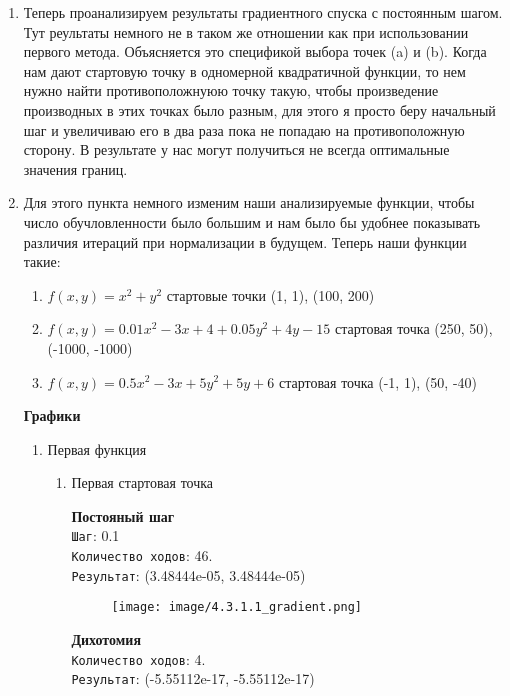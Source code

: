 \documentclass[12pt, a4paper]{article}
\begin{document}
\begin{enumerate}
\begin{enumerate}
    \item Теперь проанализируем результаты градиентного спуска с постоянным шагом. Тут реультаты немного не в таком же отношении как при использовании первого метода. Объясняется это спецификой выбора точек (a) и (b). Когда нам дают стартовую точку в одномерной квадратичной функции, то нем нужно найти противоположнуюю точку такую, чтобы произведение производных в этих точках было разным, для этого я просто беру начальный шаг и увеличиваю его в два раза пока не попадаю на противоположную сторону. В результате у нас могут получиться не всегда оптимальные значения границ.

    \item Для этого пункта немного изменим наши анализируемые функции, чтобы число обучловленности было большим и нам было бы удобнее показывать различия итераций при нормализации в будущем. Теперь наши функции такие:
    \begin{enumerate}
    \item $f(x, y) = x^2 + y^2$ стартовые точки (1, 1), (100, 200)
        \item $f(x, y) = 0.01x^2 - 3x + 4 + 0.05y^2 + 4y - 15$ стартовая точка (250, 50), (-1000, -1000)
        \item $f(x, y) = 0.5x^2 - 3x + 5y^2 + 5y + 6$ стартовая точка (-1, 1), (50, -40)
    \end{enumerate}
\newpage
    \textbf{Графики}
    \begin{enumerate}
        \item Первая функция

        \begin{enumerate}
            \item Первая стартовая точка

            \textbf{Постояный шаг}\\
            \texttt{Шаг}: 0.1\\
            \texttt{Количество ходов}: 46.\\
            \texttt{Результат}: (3.48444e-05, 3.48444e-05)
            
            \begin{figure}[h]
            \centering
            \texttt{[image: image/4.3.1.1\_gradient.png]}
            \end{figure}

            \textbf{Дихотомия}\\
            \texttt{Количество ходов}: 4.\\
            \texttt{Результат}: (-5.55112e-17, -5.55112e-17)
            

\end{enumerate}
\end{enumerate}
\end{enumerate}
\end{enumerate}
\end{document}
